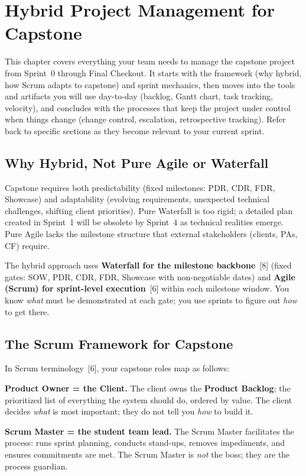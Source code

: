\chapter{Hybrid Project Management for Capstone}

This chapter covers everything your team needs to manage the capstone project from Sprint~0 through Final Checkout. It starts with the framework (why hybrid, how Scrum adapts to capstone) and sprint mechanics, then moves into the tools and artifacts you will use day-to-day (backlog, Gantt chart, task tracking, velocity), and concludes with the processes that keep the project under control when things change (change control, escalation, retrospective tracking). Refer back to specific sections as they become relevant to your current sprint.

\section{Why Hybrid, Not Pure Agile or Waterfall}
Capstone requires both predictability (fixed milestones: PDR, CDR, FDR, Showcase) and adaptability (evolving requirements, unexpected technical challenges, shifting client priorities). Pure Waterfall is too rigid; a detailed plan created in Sprint~1 will be obsolete by Sprint~4 as technical realities emerge. Pure Agile lacks the milestone structure that external stakeholders (clients, PAs, CF) require.

The hybrid approach uses \textbf{Waterfall for the milestone backbone}~[8] (fixed gates: SOW, PDR, CDR, FDR, Showcase with non-negotiable dates) and \textbf{Agile (Scrum) for sprint-level execution}~[6] within each milestone window. You know \emph{what} must be demonstrated at each gate; you use sprints to figure out \emph{how} to get there.

\section{The Scrum Framework for Capstone}
In Scrum terminology~[6], your capstone roles map as follows:

\textbf{Product Owner = the Client.} The client owns the \textbf{Product Backlog}; the prioritized list of everything the system should do, ordered by value. The client decides \emph{what} is most important; they do not tell you \emph{how} to build it.

\textbf{Scrum Master = the student team lead.} The Scrum Master facilitates the process: runs sprint planning, conducts stand-ups, removes impediments, and ensures commitments are met. The Scrum Master is \emph{not} the boss; they are the process guardian.

